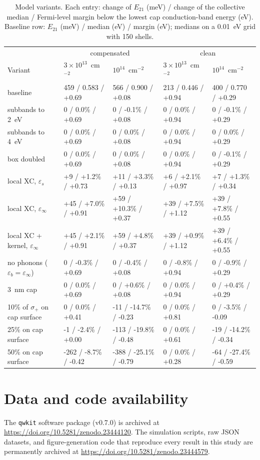 \documentclass[11pt]{article}
\begin{document}
\begin{table}[h]
\centering\footnotesize
\caption{Model variants. Each entry: change of $E_{21}$ (meV) / change of the collective median / Fermi-level margin below the lowest cap conduction-band energy (eV). Baseline row: $E_{21}$ (meV) / median (eV) / margin (eV); medians on a 0.01~eV grid with 150 shells.}\label{tab:checks}
\begin{tabular}{lllll}
\toprule
 & \multicolumn{2}{c}{compensated} & \multicolumn{2}{c}{clean} \\
Variant & $3\times10^{13}$~cm$^{-2}$ & $10^{14}$~cm$^{-2}$ & $3\times10^{13}$~cm$^{-2}$ & $10^{14}$~cm$^{-2}$ \\
\midrule
baseline & 459 / 0.583 / +0.69 & 566 / 0.900 / +0.08 & 213 / 0.446 / +0.94 & 400 / 0.770 / +0.29 \\
subbands to 2~eV & 0 / 0.0\% / +0.69 & 0 / -0.1\% / +0.08 & 0 / 0.0\% / +0.94 & 0 / -0.1\% / +0.29 \\
subbands to 4~eV & 0 / 0.0\% / +0.69 & 0 / 0.0\% / +0.08 & 0 / 0.0\% / +0.94 & 0 / 0.0\% / +0.29 \\
box doubled & 0 / 0.0\% / +0.69 & 0 / 0.0\% / +0.08 & 0 / 0.0\% / +0.94 & 0 / -0.1\% / +0.29 \\
local XC, $\varepsilon_s$ & +9 / +1.2\% / +0.73 & +11 / +3.3\% / +0.13 & +6 / +2.1\% / +0.97 & +7 / +1.3\% / +0.34 \\
local XC, $\varepsilon_\infty$ & +45 / +7.0\% / +0.91 & +59 / +10.3\% / +0.37 & +39 / +7.5\% / +1.12 & +39 / +7.8\% / +0.55 \\
local XC + kernel, $\varepsilon_\infty$ & +45 / +2.1\% / +0.91 & +59 / +4.8\% / +0.37 & +39 / +0.9\% / +1.12 & +39 / +6.4\% / +0.55 \\
no phonons ($\varepsilon_b=\varepsilon_\infty$) & 0 / -0.3\% / +0.69 & 0 / -0.4\% / +0.08 & 0 / -0.8\% / +0.94 & 0 / -0.9\% / +0.29 \\
3~nm cap & 0 / 0.0\% / +0.69 & 0 / +0.6\% / +0.08 & 0 / 0.0\% / +0.94 & 0 / +0.4\% / +0.29 \\
10\% of $\sigma_+$ on cap surface & 0 / 0.0\% / +0.41 & -11 / -14.7\% / -0.23 & 0 / 0.0\% / +0.81 & 0 / -3.5\% / -0.09 \\
25\% on cap surface & -1 / -2.4\% / +0.00 & -113 / -19.8\% / -0.48 & 0 / 0.0\% / +0.61 & -19 / -14.2\% / -0.34 \\
50\% on cap surface & -262 / -8.7\% / -0.42 & -388 / -25.1\% / -0.79 & 0 / 0.0\% / +0.28 & -64 / -27.4\% / -0.59 \\
\bottomrule
\end{tabular}
\end{table}


\section*{Data and code availability}
The \texttt{qwkit} software package (v0.7.0) is archived at \url{https://doi.org/10.5281/zenodo.23444120}. The simulation scripts, raw JSON datasets, and figure-generation code that reproduce every result in this study are permanently archived at \url{https://doi.org/10.5281/zenodo.23444579}.



\end{document}
